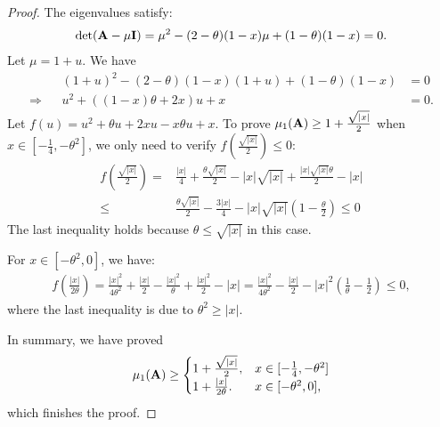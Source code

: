 \begin{proof}
The eigenvalues satisfy:
\begin{align*}
\text{det} (\mathbf{A} - \mu \mathbf{I}) = \mu^2 - (2-\theta)(1-x)\mu + (1-\theta)(1-x) = 0.
\end{align*}
Let $\mu = 1+u$. We have 
\begin{align*}
&& (1+u)^2 - (2-\theta)(1-x)(1+u) + (1-\theta)(1-x) &= 0 \\
\Rightarrow  && u^2 +  ((1-x)\theta + 2x) u + x&= 0.
\end{align*}
Let $f(u) = u^2 + \theta u + 2xu - x\theta u + x$.  To prove $\mu_1(\mathbf{A}) \ge 1 + \frac{\sqrt{|x|}}{2}$ when $x\in [-\frac{1}{4}, -\theta^2]$, we only need to verify $f(\frac{\sqrt{|x|}}{2}) \le 0$:
\begin{align*}
f(\frac{\sqrt{|x|}}{2}) = &\frac{|x|}{4} + \frac{\theta\sqrt{|x|}}{2}
- |x|\sqrt{|x|} + \frac{|x|\sqrt{|x|}\theta}{2} - |x| \\
\le &  \frac{\theta\sqrt{|x|}}{2}- \frac{3|x|}{4} -|x|\sqrt{|x|}(1-\frac{\theta}{2})\le 0
\end{align*}
The last inequality holds because $\theta \le \sqrt{|x|}$ in this case.

For $x\in [-\theta^2, 0]$, we have:
\begin{align*}
f(\frac{|x|}{2\theta}) = \frac{|x|^2}{4\theta^2} + \frac{|x|}{2} - \frac{|x|^2}{\theta}
+ \frac{|x|^2}{2} - |x|
= \frac{|x|^2}{4\theta^2} - \frac{|x|}{2} -|x|^2(\frac{1}{\theta} - \frac{1}{2})\le 0,
\end{align*}
where the last inequality is due to $\theta^2 \ge |x|$.

In summary, we have proved
\begin{equation*}
\mu_1(\mathbf{A}) \ge 
\begin{cases}
1 + \frac{\sqrt{|x|}}{2}, & x \in  [-\frac{1}{4}, -\theta^2]\\
1 + \frac{|x|}{2\theta}.& x \in  [-\theta^2, 0],
\end{cases}
\end{equation*}
which finishes the proof.
\end{proof}




